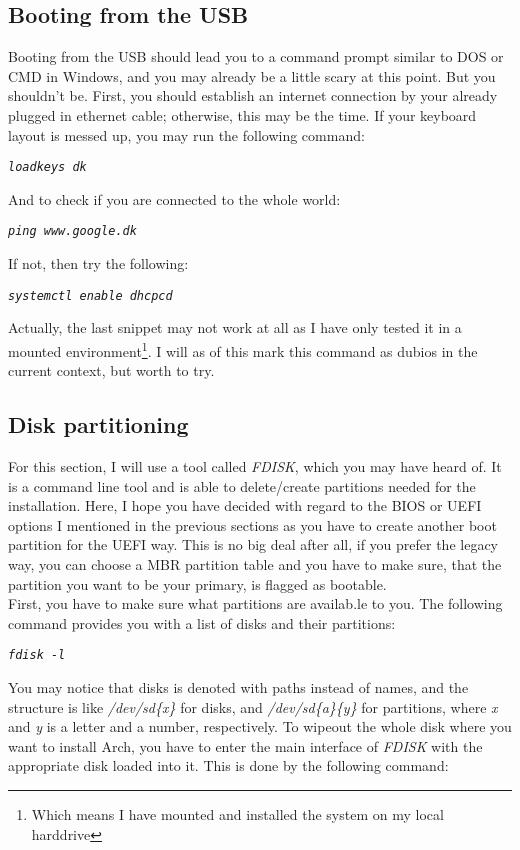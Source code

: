 \documentclass{article}
\newcommand{\code}[1]{\begin{center}
		\textit{\texttt{#1}}
\end{center}}
\begin{document}
	 \subsection{Booting from the USB}
	 
	 Booting from the USB should lead you to a command prompt similar to DOS or CMD in Windows, and you may already be a little scary at this point. But you shouldn't be. First, you should establish an internet connection by your already plugged in ethernet cable; otherwise, this may be the time. If your keyboard layout is messed up, you may run the following command:
	 
	 \code{loadkeys dk}
	 
	 And to check if you are connected to the whole world:
	 
	 \code{ping www.google.dk}
	 
	 If not, then try the following:
	 
	 \code{systemctl enable dhcpcd}
	 
	 Actually, the last snippet may not work at all as I have only tested it in a mounted environment\footnote{Which means I have mounted and installed the system on my local harddrive}. I will as of this mark this command as dubios in the current context, but worth to try.\\
	 
	 \subsection{Disk partitioning}
	 
	 For this section, I will use a tool called \textit{FDISK}, which you may have heard of. It is a command line tool and is able to delete/create partitions needed for the installation. Here, I hope you have decided with regard to the BIOS or UEFI options I mentioned in the previous sections as you have to create another boot partition for the UEFI way. This is no big deal after all, if you prefer the legacy way, you can choose a MBR partition table and you have to make sure, that the partition you want to be your primary, is flagged as bootable.\\
	 
	 First, you have to make sure what partitions are availab.le to you. The following command provides you with a list of disks and their partitions:
	 
	 \code{fdisk -l}
	 
	 You may notice that disks is denoted with paths instead of names, and the structure is like \textit{/dev/sd\{x\}} for disks, and \textit{/dev/sd\{a\}\{y\}} for partitions, where \textit{x} and \textit{y} is a letter and a number, respectively. To wipeout the whole disk where you want to install Arch, you have to enter the main interface of \textit{FDISK} with the appropriate disk loaded into it. This is done by the following command:
	 
\end{document}
